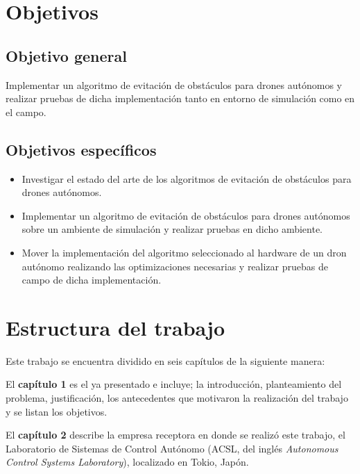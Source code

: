    
\section{Objetivos}

    \subsection{Objetivo general}
    
    Implementar un algoritmo de evitación de obstáculos para drones autónomos y realizar
    pruebas de dicha implementación tanto en entorno de simulación como en el campo.
    
    \subsection{Objetivos específicos}
    
    \begin{itemize}
        \item Investigar el estado del arte de los algoritmos de evitación de obstáculos para drones autónomos.
        \item Implementar un algoritmo de evitación de obstáculos para drones autónomos sobre un ambiente de simulación y realizar pruebas en dicho ambiente.
        \item Mover la implementación del algoritmo seleccionado al hardware de un dron autónomo realizando las optimizaciones necesarias y realizar pruebas de campo de dicha implementación.
    \end{itemize}

\section{Estructura del trabajo}

    \par Este trabajo se encuentra dividido en seis capítulos de la siguiente manera:
    
    \par El \textbf{capítulo 1} es el ya presentado e incluye; la introducción, planteamiento del problema, justificación, los antecedentes que motivaron la realización del trabajo y se listan los objetivos.

    \par El \textbf{capítulo 2} describe la empresa receptora en donde se realizó este trabajo, el Laboratorio de Sistemas de Control Autónomo (ACSL, del inglés \textit{Autonomous Control Systems Laboratory}), localizado en Tokio, Japón. 
    
